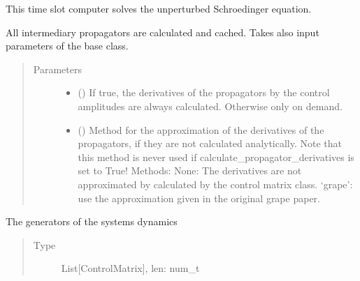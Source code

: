 \documentclass[letterpaper,10pt,english]{sphinxmanual}
\begin{document}
\begin{fulllineitems}
This time slot computer solves the unperturbed Schroedinger equation.

All intermediary propagators are calculated and cached. Takes also input
parameters of the base class.
\begin{quote}\begin{description}
\item[{Parameters}] \leavevmode\begin{itemize}
\item {} 
 () \textendash{} If true, the derivatives of the propagators by the control amplitudes
are always calculated. Otherwise only on demand.

\item {} 
 (\sphinxstyleliteralemphasis{\sphinxupquote{{[}}}\sphinxstyleliteralemphasis{\sphinxupquote{{]}}}) \textendash{} Method for the approximation of the derivatives of the propagators, if
they are not calculated analytically. Note that this method is never
used if calculate\_propagator\_derivatives is set to True!
Methods:
None: The derivatives are not approximated by calculated by the control
matrix class.
‘grape’: use the approximation given in the original grape paper.

\end{itemize}

\end{description}\end{quote}

\begin{fulllineitems}
\label{\detokenize{qsim:qsim.solver_algorithms.SchroedingerSolver._dyn_gen}}
The generators of the systems dynamics
\begin{quote}\begin{description}
\item[{Type}] \leavevmode
List{[}ControlMatrix{]}, len: num\_t

\end{description}\end{quote}

\end{fulllineitems}


\end{fulllineitems}
\end{document}
